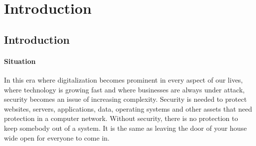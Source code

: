 \chapter{Introduction}
\label{cha:10}
%


\section{Introduction}



\subsubsection{Situation}




In this era where digitalization becomes prominent in every aspect of our lives, where technology is growing fast and where businesses are always under attack, security becomes an issue of increasing complexity. Security is needed to protect websites, servers, applications, data, operating systems and other assets that need protection in a computer network. Without security, there is no protection to keep somebody out of a system. It is the same as leaving the door of your house wide open for everyone to come in. \\

